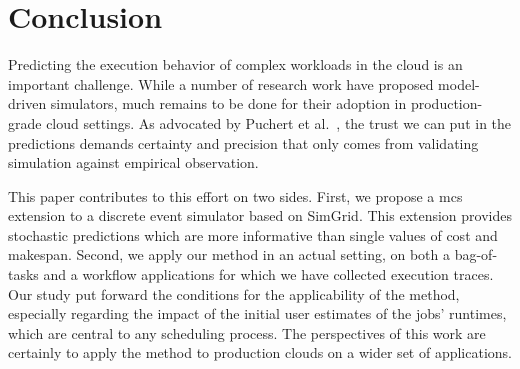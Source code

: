 \documentclass[10pt,conference,compsocconf]{IEEEtran}
\begin{document}
\section{Conclusion}

Predicting  the execution  behavior  of complex  workloads in  the  cloud is  an
important challenge. While a number  of research work have proposed model-driven
simulators, much remains to be done for their adoption in production-grade cloud
settings. As  advocated by Puchert  et al.~\cite{PucherGWK15}, the trust  we can
put in  the predictions  demands certainty  and precision  that only  comes from
validating simulation against empirical observation.

This  paper contributes  to  this effort  on  two sides.   First,  we propose  a
\acl{mcs}  extension to  a  discrete  event simulator  based  on SimGrid.   This
extension provides stochastic predictions which are more informative than single
values of cost and makespan.  Second, we  apply our method in an actual setting,
on both a  bag-of-tasks and a workflow applications for  which we have collected
execution traces. Our study put forward  the conditions for the applicability of
the method, especially regarding the impact of the initial user estimates of the
jobs' runtimes, which are central to any scheduling process. The perspectives of
this work are certainly to apply the method to production clouds on a wider set 
of applications.  




\newpage
\end{document}
